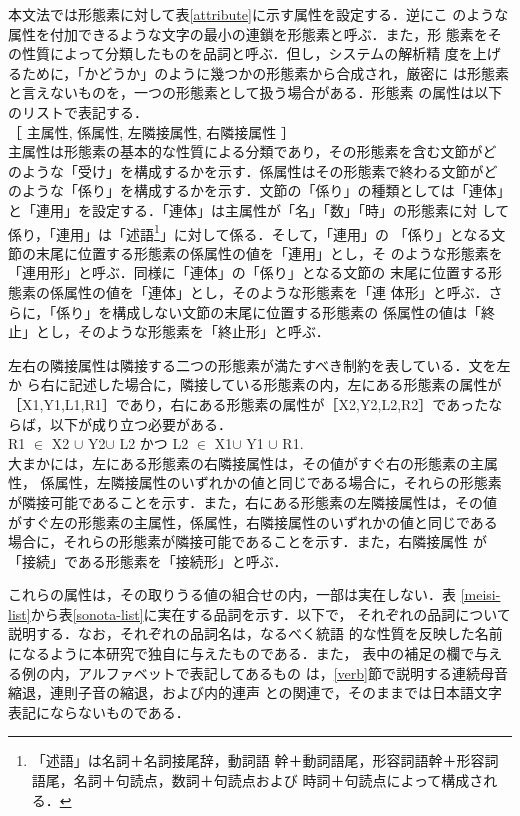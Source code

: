 本文法では形態素に対して表\ref{attribute}に示す属性を設定する．逆にこ
のような属性を付加できるような文字の最小の連鎖を形態素と呼ぶ．また，形
態素をその性質によって分類したものを品詞と呼ぶ．但し，システムの解析精
度を上げるために，「かどうか」のように幾つかの形態素から合成され，厳密に
は形態素と言えないものを，一つの形態素として扱う場合がある．形態素
の属性は以下のリストで表記する．\\
［ 主属性, 係属性, 左隣接属性, 右隣接属性 ］\\
主属性は形態素の基本的な性質による分類であり，その形態素を含む文節がど
のような「受け」を構成するかを示す．係属性はその形態素で終わる文節がど
のような「係り」を構成するかを示す．文節の「係り」の種類としては「連体」
と「連用」を設定する．「連体」は主属性が「名」「数」「時」の形態素に対
して係り，「連用」は「述語\footnote{「述語」は名詞＋名詞接尾辞，動詞語
幹＋動詞語尾，形容詞語幹＋形容詞語尾，名詞＋句読点，数詞＋句読点および
時詞＋句読点によって構成される．}」に対して係る．そして，「連用」の
「係り」となる文節の末尾に位置する形態素の係属性の値を「連用」とし，そ
のような形態素を「連用形」と呼ぶ．同様に「連体」の「係り」となる文節の
末尾に位置する形態素の係属性の値を「連体」とし，そのような形態素を「連
体形」と呼ぶ．さらに，「係り」を構成しない文節の末尾に位置する形態素の
係属性の値は「終止」とし，そのような形態素を「終止形」と呼ぶ．

左右の隣接属性は隣接する二つの形態素が満たすべき制約を表している．文を左か
ら右に記述した場合に，隣接している形態素の内，左にある形態素の属性が
［X1,Y1,L1,R1］であり，右にある形態素の属性が［X2,Y2,L2,R2］であったな
らば，以下が成り立つ必要がある．\\
R1 $\in$ X2 $\cup$ Y2$ \cup$ L2 かつ L2 $\in$ X1$ \cup$ Y1 $\cup$ R1.\\
大まかには，左にある形態素の右隣接属性は，その値がすぐ右の形態素の主属性，
係属性，左隣接属性のいずれかの値と同じである場合に，それらの形態素
が隣接可能であることを示す．また，右にある形態素の左隣接属性は，その値
がすぐ左の形態素の主属性，係属性，右隣接属性のいずれかの値と同じである
場合に，それらの形態素が隣接可能であることを示す．また，右隣接属性
が「接続」である形態素を「接続形」と呼ぶ．

これらの属性は，その取りうる値の組合せの内，一部は実在しない．表
\ref{meisi-list}から表\ref{sonota-list}に実在する品詞を示す．以下で，
それぞれの品詞について説明する．なお，それぞれの品詞名は，なるべく統語
的な性質を反映した名前になるように本研究で独自に与えたものである．また，
表中の補足の欄で与える例の内，アルファベットで表記してあるもの
は，\ref{verb}節で説明する連続母音縮退，連則子音の縮退，および内的連声
との関連で，そのままでは日本語文字表記にならないものである．


